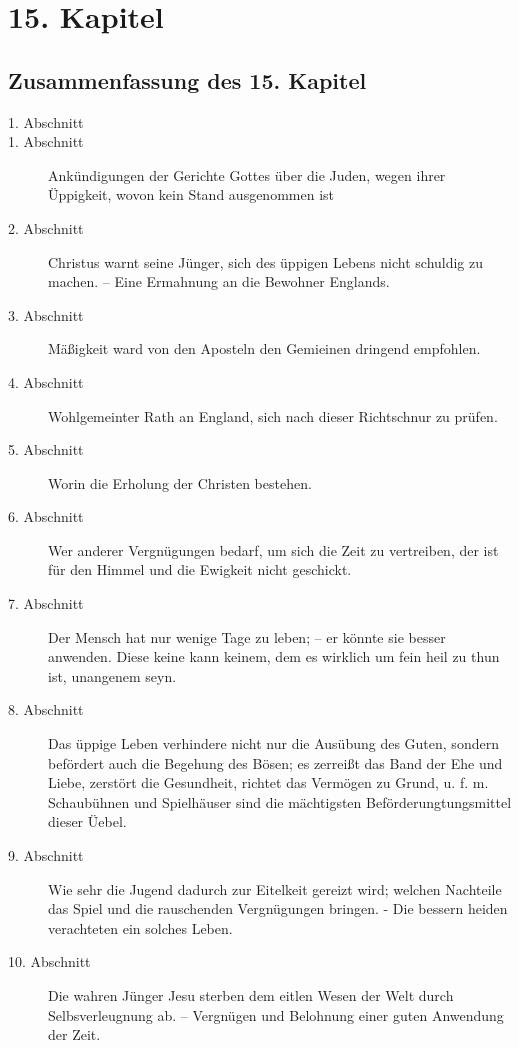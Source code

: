 
\chapter{15. Kapitel} \label{kap15}

\section{Zusammenfassung des 15. Kapitel}
\small
\begin{description}
\item[1. Abschnitt]
\item[1. Abschnitt] Ankündigungen der Gerichte Gottes über die Juden, wegen
ihrer Üppigkeit, wovon kein Stand ausgenommen ist
\item[2. Abschnitt] Christus warnt seine Jünger, sich des üppigen Lebens nicht
schuldig zu machen. -- Eine Ermahnung an die Bewohner Englands.
\item[3. Abschnitt] Mäßigkeit ward von den Aposteln den Gemieinen dringend
empfohlen.
\item[4. Abschnitt] Wohlgemeinter Rath an England, sich nach dieser Richtschnur
zu prüfen.
\item[5. Abschnitt] Worin die Erholung der Christen bestehen.
\item[6. Abschnitt] Wer anderer Vergnügungen bedarf, um sich die Zeit zu
vertreiben, der ist für den Himmel und die Ewigkeit nicht geschickt.
\item[7. Abschnitt] Der Mensch hat nur wenige Tage zu leben; -- er könnte sie
besser anwenden. Diese keine kann keinem, dem es wirklich um fein heil zu thun
ist, unangenem seyn.
\item[8. Abschnitt] Das üppige Leben verhindere nicht nur die Ausübung des
Guten, sondern befördert auch die Begehung des Bösen; es zerreißt das Band der
Ehe und Liebe, zerstört die Gesundheit, richtet das Vermögen zu Grund, u. f. m.
Schaubühnen und Spielhäuser sind die mächtigsten Beförderungtungsmittel dieser
Üebel.
\item[9. Abschnitt] Wie sehr die Jugend dadurch zur Eitelkeit gereizt wird;
welchen Nachteile das Spiel und die rauschenden Vergnügungen bringen. - Die
bessern heiden verachteten ein solches Leben.
\item[10. Abschnitt] Die wahren Jünger Jesu sterben dem eitlen Wesen der Welt
durch Selbsverleugnung ab. -- Vergnügen und Belohnung einer guten Anwendung der
Zeit.

\end{description}
\normalsize

